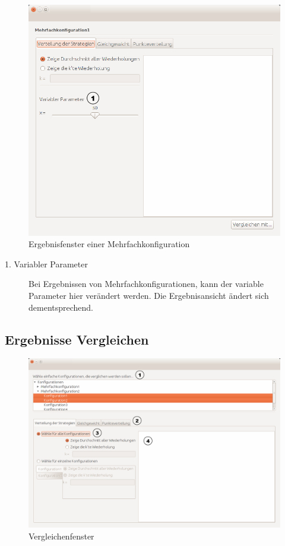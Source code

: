\begin{figure}[!hp] 
  \centering
     \includegraphics[width=1.1\textwidth]{GUI_Entwurf/MehrfachErgebnisse.png}
  \caption{Ergebnisfenster einer Mehrfachkonfiguration}
  \label{fig:Bild7}
\end{figure}

\begin{description}

\item[1. Variabler Parameter] Bei Ergebnissen von Mehrfachkonfigurationen, kann der variable Parameter hier verändert werden. Die Ergebnisansicht ändert sich dementsprechend.


\end{description}

\pagebreak


\subsection{Ergebnisse Vergleichen}

\begin{figure}[!hp] 
  \centering
     \includegraphics[width=1.15\textwidth]{GUI_Entwurf/ErgebnisseVergleichen.png}
  \caption{Vergleichenfenster}
  \label{fig:Bild1}
\end{figure}

